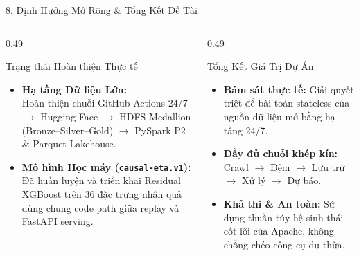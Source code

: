 \documentclass[aspectratio=169,10pt]{beamer}
\begin{document}
\begin{frame}{8. Định Hướng Mở Rộng \& Tổng Kết Đề Tài}
\begin{columns}[T]
    \begin{column}{0.49\textwidth}
        \begin{block}{Trạng thái Hoàn thiện Thực tế}
            \begin{itemize}\setlength{\itemsep}{3pt}\footnotesize
                \item \textbf{Hạ tầng Dữ liệu Lớn:}\\
                Hoàn thiện chuỗi GitHub Actions 24/7 $\to$ Hugging Face $\to$ HDFS Medallion (Bronze--Silver--Gold) $\to$ PySpark P2 \& Parquet Lakehouse.
                \item \textbf{Mô hình Học máy (\texttt{causal-eta.v1}):}\\
                Đã huấn luyện và triển khai Residual XGBoost trên 36 đặc trưng nhân quả dùng chung code path giữa replay và FastAPI serving.
            \end{itemize}
        \end{block}
    \end{column}

    \begin{column}{0.49\textwidth}
        \begin{exampleblock}{Tổng Kết Giá Trị Dự Án}
            \begin{itemize}\setlength{\itemsep}{3pt}\footnotesize
                \item \textbf{Bám sát thực tế:} Giải quyết triệt để bài toán stateless của nguồn dữ liệu mở bằng hạ tầng 24/7.
                \item \textbf{Đầy đủ chuỗi khép kín:} Crawl $\to$ Đệm $\to$ Lưu trữ $\to$ Xử lý $\to$ Dự báo.
                \item \textbf{Khả thi \& An toàn:} Sử dụng thuần túy hệ sinh thái cốt lõi của Apache, không chồng chéo công cụ dư thừa.
            \end{itemize}
        \end{exampleblock}
        
        \vspace{0.15cm}
        \centering
    \end{column}
\end{columns}
\end{frame}
\end{document}
